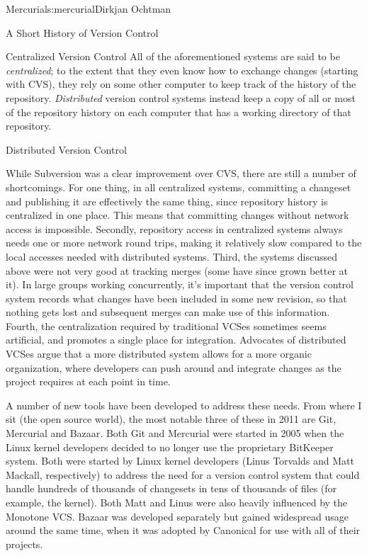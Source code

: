 \begin{aosachapter}{Mercurial}{s:mercurial}{Dirkjan Ochtman}
\begin{aosasect1}{ A Short History of Version Control}
\begin{aosasect2}{Centralized Version Control}
All of the aforementioned systems are said to be \emph{centralized};
to the extent that they even know how to exchange changes (starting
with CVS), they rely on some other computer to keep track of the
history of the repository. \emph{Distributed} version control systems
instead keep a copy of all or most of the repository history on each
computer that has a working directory of that repository.

\end{aosasect2}

\begin{aosasect2}{Distributed Version Control}

While Subversion was a clear improvement over CVS, there are still a
number of shortcomings. For one thing, in all centralized systems,
committing a changeset and publishing it are effectively the same
thing, since repository history is centralized in one place. This
means that committing changes without network access is
impossible. Secondly, repository access in centralized systems always
needs one or more network round trips, making it relatively slow compared
to the local accesses needed with distributed systems. Third, the systems
discussed above were not very good at tracking merges (some have since
grown better at it). In large groups working concurrently, it's
important that the version control system records what changes have
been included in some new revision, so that nothing gets lost and
subsequent merges can make use of this information. Fourth, the
centralization required by traditional VCSes sometimes seems
artificial, and promotes a single place for integration. Advocates of
distributed VCSes argue that a more distributed system allows for a
more organic organization, where developers can push around and
integrate changes as the project requires at each point in time.

A number of new tools have been developed to address these needs. From
where I sit (the open source world), the most notable three of these
in 2011 are Git, Mercurial and Bazaar. Both Git and Mercurial were
started in 2005 when the Linux kernel developers decided to no longer
use the proprietary BitKeeper system. Both were started by Linux
kernel developers (Linus Torvalds and Matt Mackall, respectively) to
address the need for a version control system that could handle
hundreds of thousands of changesets in tens of thousands of files (for
example, the kernel). Both Matt and Linus were also heavily influenced
by the Monotone VCS\@. Bazaar was developed separately but gained
widespread usage around the same time, when it was adopted by
Canonical for use with all of their projects.


\end{aosasect2}
\end{aosasect1}
\end{aosachapter}
